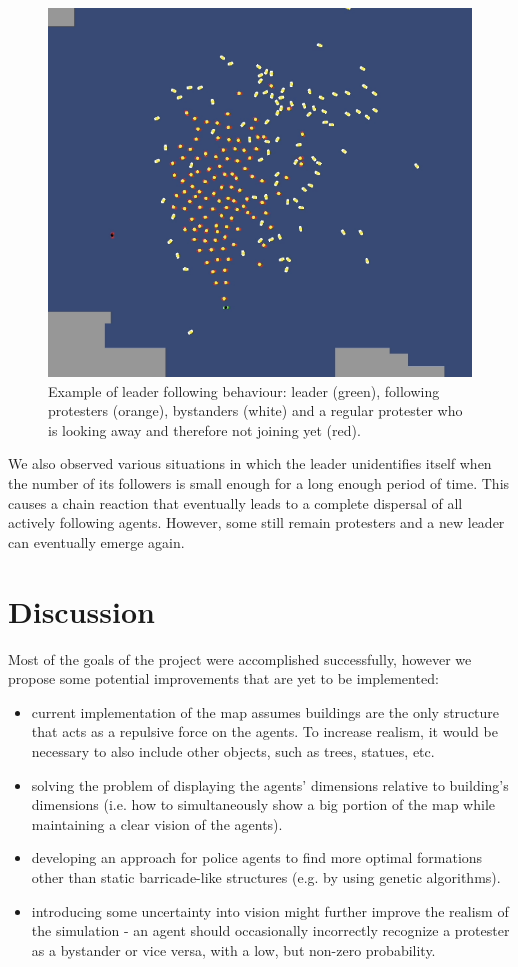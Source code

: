 \documentclass[9pt]{pnas-new}
\begin{document}
\begin{figure}[H]
\centering
\includegraphics[width=0.95\columnwidth]{followleader.png}
\caption{Example of leader following behaviour: leader (green), following protesters (orange), bystanders (white) and a regular protester who is looking away and therefore not joining yet (red).}
\label{follow}
\end{figure}

\bigskip
We also observed various situations in which the leader unidentifies itself when the number of its followers is small enough for a long enough period of time. This causes a chain reaction that eventually leads to a complete dispersal of all actively following agents. However, some still remain protesters and a new leader can eventually emerge again. 

\section*{Discussion}

Most of the goals of the project were accomplished successfully, however we propose some potential improvements that are yet to be implemented: 
\begin{itemize}
\item current implementation of the map assumes buildings are the only structure that acts as a repulsive force on the agents. To increase realism, it would be necessary to also include other objects, such as trees, statues, etc.
\item solving the problem of displaying the agents' dimensions relative to building's dimensions (i.e. how to simultaneously show a big portion of the map while maintaining a clear vision of the agents).
\item developing an approach for police agents to find more optimal formations other than static barricade-like structures (e.g. by using genetic algorithms). 
\item introducing some uncertainty into vision might further improve the realism of the simulation - an agent should occasionally incorrectly recognize a protester as a bystander or vice versa, with a low, but non-zero probability. 
\end{itemize}
\end{document}
